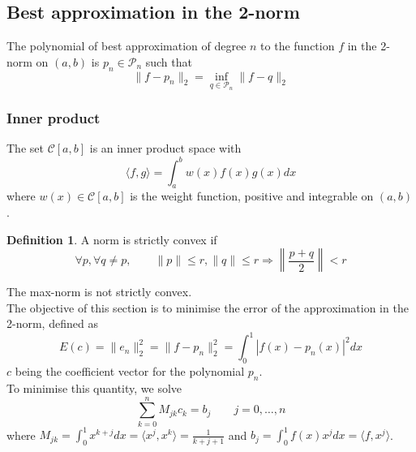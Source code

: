 \documentclass[12pt, openany]{report}
\theoremstyle{definition}
\newtheorem{definition}[thm]{Definition}
\begin{document}
\subsection{Best approximation in the 2-norm}
The polynomial of best approximation of degree $n$ to the function $f$ in the 2-norm on $(a,b)$ is $p_n\in \mathcal{P}_n$ such that 
\begin{equation}
    \lVert f-p_n\rVert_2 = \inf_{q\in \mathcal{P}_n} \lVert f-q\rVert_2
\end{equation}
\subsubsection{Inner product}
The set $\mathcal{C}[a,b]$ is an inner product space with 
\begin{equation}\label{eq:inner_prod}
    \langle f,g\rangle = \int_a^b w(x)f(x)g(x)dx
\end{equation}
where $w(x)\in \mathcal{C}[a,b]$ is the weight function, positive and integrable on $(a,b)$. 
\begin{definition}
    A norm is strictly convex if 
    \begin{equation}
        \forall p,\forall q\neq p, \qquad \lVert p\rVert \le r ,\lVert q\rVert \le r \Longrightarrow \left\rVert \frac{p+q}{2}\right\rVert < r
    \end{equation}
\end{definition}
The max-norm is not strictly convex.\\

The objective of this section is to minimise the error of the approximation in the 2-norm, defined as
\begin{equation}
    E(c) = \lVert e_n\rVert_2^2 = \lVert f-p_n\rVert_2^2 = \int_0^1 |f(x)-p_n(x)|^2dx
\end{equation}
$c$ being the coefficient vector for the polynomial $p_n$. \\
To minimise this quantity, we solve
\begin{equation}
    \sum_{k=0}^n M_{jk}c_k = b_j \qquad j=0,\dots,n
\end{equation}
where $M_{jk} = \int_0^1 x^{k+j}dx = \langle x^j,x^k\rangle = \frac{1}{k+j+1}$ and $b_j = \int_0^1 f(x)x^jdx = \langle f,x^j\rangle$. 
\end{document}
